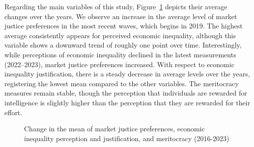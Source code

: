 \documentclass[
  12pt,
]{article}
\begin{document}
Regarding the main variables of this study, Figure~\ref{fig-meanchange}
depicts their average changes over the years. We observe an increase in
the average level of market justice preferences in the most recent
waves, which begins in 2019. The highest average consistently appears
for perceived economic inequality, although this variable shows a
downward trend of roughly one point over time. Interestingly, while
perceptions of economic inequality declined in the latest measurements
(2022--2023), market justice preferences increased. With respect to
economic inequality justification, there is a steady decrease in average
levels over the years, registering the lowest mean compared to the other
variables. The meritocracy measures remain stable, though the perception
that individuals are rewarded for intelligence is slightly higher than
the perception that they are rewarded for their effort.

\begin{figure}[H]

\caption{\label{fig-meanchange}Change in the mean of market justice
preferences, economic inequality perception and justification, and
meritocracy (2016-2023)}


\end{figure}%
\end{document}
